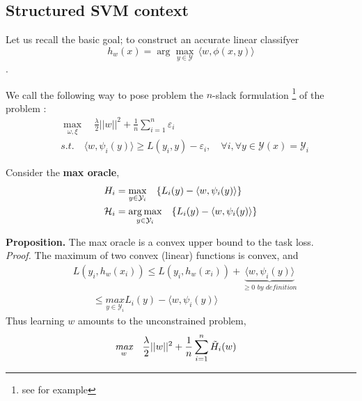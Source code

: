 \subsection{Structured SVM context}
Let us recall the basic goal; to construct an accurate linear classifyer
\begin{equation}
  h_{w}(x)= \arg\max_{y\in \mathcal Y} \, \langle w, \phi(x,y)\rangle
\end{equation}.

We call the following way to pose problem the $n$-slack formulation
\footnote{see \citet{moguerzaSupportVectorMachines2006} for example} of the problem :
\begin{align}
    &\max_{\omega, \xi}\quad\frac{\lambda}{2}||w||^{2}+ \frac{1}{n}\sum_{i=1}^{n}\varepsilon_{i}\\
    &\textit{s.t.}\quad \langle w, \psi_{i}(y)\rangle \geq L(y_{i},y)-
\varepsilon_{i},\quad\forall i ,\forall y\in\mathcal{Y}(x)=\mathcal{Y}_{i}
\end{align}

Consider the \textbf{max oracle},
\begin{align}
H_i &= \max_{y\in\mathcal{Y}_{i}} \quad \{L_{i}(y)- \langle w, \psi_{i}(y)\rangle\} \\
\mathcal H_i &= \operatorname*{\arg\max}_{y\in\mathcal{Y}_{i}} \quad \{ L_{i}(y)- \langle w, \psi_{i}(y)\rangle \}
\end{align}

\textbf{Proposition.} The max oracle is a convex upper bound to the task loss.\\
\textit{Proof.} The maximum of two convex (linear) functions is convex, and
\begin{equation*}
\begin{aligned}
    &L(y_{i},h_{w}(x_{i})) \leq L(y_{i},h_{w}(x_{i})) + \underbrace{\langle w, \psi_{i}(y)\rangle}_{\geq 0 \textit{ by definition}} \\
    &\quad\quad\leq \underset{y\in\mathcal{Y}_{i}}{\textit{max}} L_{i}(y)- \langle w, \psi_{i}(y)\rangle
\end{aligned}
\end{equation*}
Thus learning $w$ amounts to the unconstrained problem,
\begin{equation*}
\begin{aligned}
    &\underset{w}{\textit{max}}\quad\frac{\lambda}{2}||w||^{2}+ \frac{1}{n}\sum_{i=1}^{n}\Tilde{H}_{i}(w)
\end{aligned}
\end{equation*}

